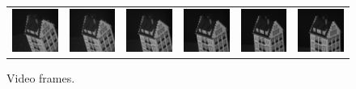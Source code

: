 \documentclass[]{IEEEtran}
\begin{document}
\begin{figure}[tb]
    \centering
    \begin{tabular}{c c c c c c}
    \includegraphics[width=0.14\linewidth]{./figures/video/hotel1.png} &
    \includegraphics[width=0.14\linewidth]{./figures/video/hotel10.png} &
    \includegraphics[width=0.14\linewidth]{./figures/video/hotel20.png} &
    \includegraphics[width=0.14\linewidth]{./figures/video/hotel30.png} &
    \includegraphics[width=0.14\linewidth]{./figures/video/hotel40.png} &
    \includegraphics[width=0.14\linewidth]{./figures/video/hotel50.png}
    \end{tabular}
    \caption{Video frames.}
    \label{fig:video_frames}
\end{figure}
\end{document}
